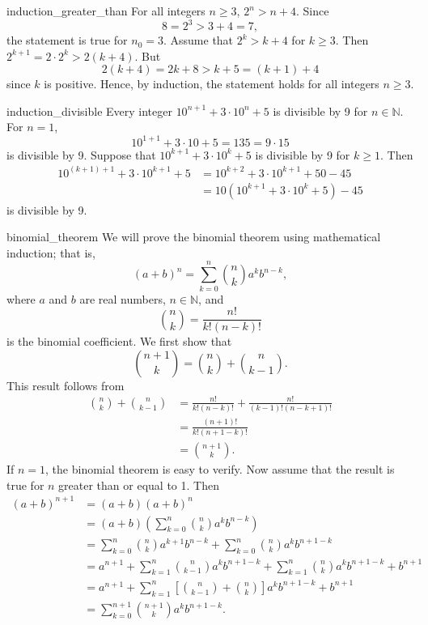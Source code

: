 \begin{example}{induction_greater_than}
For all integers $n \geq 3$, $2^n > n + 4$. Since
\[
8 = 2^3 > 3 + 4 = 7,
\]
the statement is true for $n_0 = 3$.  Assume that $2^k > k + 4$ for $k \geq 3$.  Then $2^{k + 1} = 2 \cdot 2^{k} > 2(k + 4)$.  But 
\[
2(k + 4) = 2k + 8 > k + 5 = (k + 1) + 4
\]
since $k$ is positive.  Hence, by induction, the statement holds for all integers $n \geq 3$. 
\end{example}

\begin{example}{induction_divisible}
Every integer $10^{n + 1} + 3 \cdot 10^n + 5$ is divisible by 9 for $n \in {\mathbb N}$.  For $n = 1$, 
\[
10^{1 + 1} + 3 \cdot 10 + 5 = 135 = 9 \cdot 15
\]
is divisible by 9.  Suppose that $10^{k + 1} + 3 \cdot 10^k + 5$ is divisible by 9 for $k \geq 1$.  Then 
\begin{align*}
10^{(k + 1) + 1} + 3 \cdot 10^{k + 1} + 5
& =
10^{k + 2} + 3 \cdot 10^{k + 1} + 50 - 45 \\
& =
10 (10^{k + 1} + 3 \cdot 10^{k} + 5) - 45
\end{align*}
is divisible by 9.
\end{example}

\begin{example}{binomial_theorem}
We will prove the binomial theorem using mathematical induction; that is, 
\[
(a + b)^n = \sum_{k = 0}^{n} \binom{n}{k} a^k b^{n - k},
\]
where $a$ and $b$ are real numbers, $n \in \mathbb{N}$, and
\[
\binom{n}{k}
= \frac{n!}{k! (n - k)!}\label{factorial}
\]
is the binomial coefficient.\label{binomial}  We first show that
\[
\binom{n + 1}{k}
=
\binom{n}{k} + \binom{n}{k - 1}.
\]
This result follows from
\begin{align*}
\binom{n}{k} + \binom{n}{k - 1}
& =
\frac{n!}{k!(n - k)!}
+\frac{n!}{(k-1)!(n - k + 1)!} \\
& =
\frac{(n + 1)!}{k!(n + 1 - k)!} \\
& =
\binom{n + 1}{k}.
\end{align*}
If $n = 1$, the binomial theorem is easy to verify. Now assume that the result is true for $n$ greater than or equal to 1.  Then
\begin{align*}
(a + b)^{n + 1}
& = 
(a + b)(a + b)^n \\
& =
(a + b) 
\left(
\sum_{k = 0}^{n} \binom{n}{k} a^k b^{n - k}
\right) \\
& = 
\sum_{k = 0}^{n} \binom{n}{k} a^{k + 1} b^{n - k}   +
\sum_{k = 0}^{n} \binom{n}{k} a^k b^{n + 1 - k} \\
& = 
a^{n + 1} + \sum_{k = 1}^{n} \binom{n}{k - 1} a^{k} b^{n + 1 - k} 
 +
\sum_{k = 1}^{n} \binom{n}{k}  a^k b^{n + 1 - k} + b^{n + 1}\\
&  = 
a^{n + 1} + \sum_{k = 1}^{n} \left[ \binom{n}{k - 1}
+
\binom{n}{k} \right]
a^k b^{n + 1 - k} + b^{n + 1} \\
&  = 
\sum_{k = 0}^{n + 1}   \binom{n + 1}{k} a^k b^{n + 1- k}.
\end{align*}
\end{example}
 
